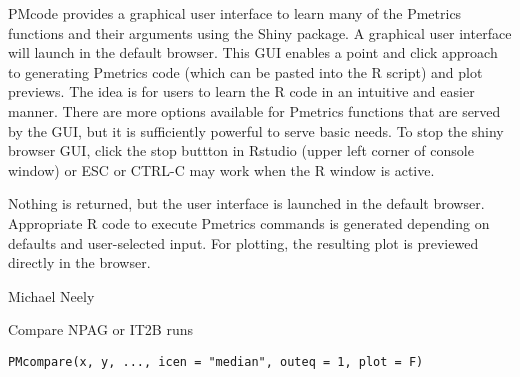 \documentclass[a4paper]{book}
\begin{document}
%
\begin{Details}\relax
PMcode provides a graphical user interface to learn many of the Pmetrics functions and their arguments
using the Shiny package. A graphical user interface will launch in the default browser.  This GUI enables a point
and click approach to generating Pmetrics code (which can be pasted into the R script) and plot previews.
The idea is for users to learn the R code in an intuitive and easier manner.  There are more options available for Pmetrics
functions that are served by the GUI, but it is sufficiently powerful to serve basic needs.  To stop the shiny browser GUI, click
the stop buttton in Rstudio (upper left corner of console window) or ESC or CTRL-C may work when the R window is active.
\end{Details}
%
\begin{Value}
Nothing is returned, but the user interface is launched in the default browser.  Appropriate R code to execute
Pmetrics commands is generated depending on defaults and user-selected input.  For plotting, the resulting plot is previewed
directly in the browser.
\end{Value}
%
\begin{Author}\relax
Michael Neely
\end{Author}
%
\begin{Description}\relax
Compare NPAG or IT2B runs
\end{Description}
%
\begin{Usage}
\begin{verbatim}
PMcompare(x, y, ..., icen = "median", outeq = 1, plot = F)
\end{verbatim}
\end{Usage}
%
\end{document}
